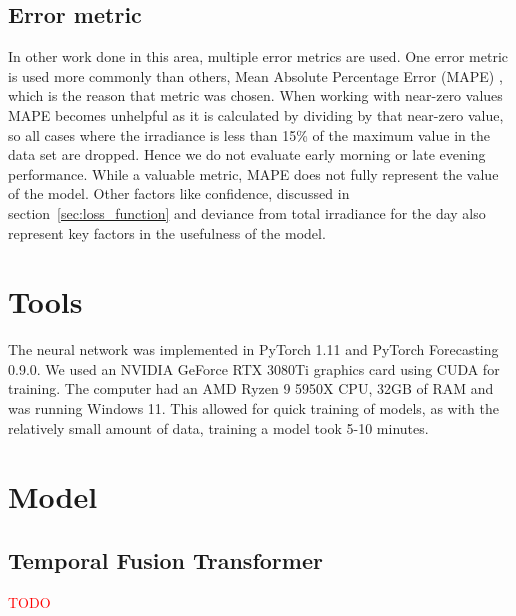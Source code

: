 \subsection{Error metric}
In other work done in this area, multiple error metrics are used. One error metric is used more commonly than others, Mean Absolute Percentage Error (MAPE) \cite{lin_temporal_2020, lee_forecasting_2018, jaidee_very_2019, su_machine_2019}, which is the reason that metric was chosen.
When working with near-zero values MAPE becomes unhelpful as it is calculated by dividing by that near-zero value, so all cases where the irradiance is less than 15\% of the maximum value in the data set are dropped. Hence we do not evaluate early morning or late evening performance.
While a valuable metric, MAPE does not  fully represent the value of the model. Other factors like confidence, discussed in section~\ref{sec:loss_function} and deviance from total irradiance for the day also represent key factors in the usefulness of the model.

\newpage


\section{Tools}
The neural network was implemented in PyTorch 1.11 and PyTorch Forecasting 0.9.0. We used an NVIDIA GeForce RTX 3080Ti graphics card using CUDA for training. The computer had an AMD Ryzen 9 5950X CPU, 32GB of RAM and was running Windows 11.
This allowed for quick training of models, as with the relatively small amount of data, training a model took 5-10 minutes.


\newpage
\section{Model}
    \subsection{Temporal Fusion Transformer}
    \textcolor{red}{TODO}
    \cite{lim_temporal_2020}
    
